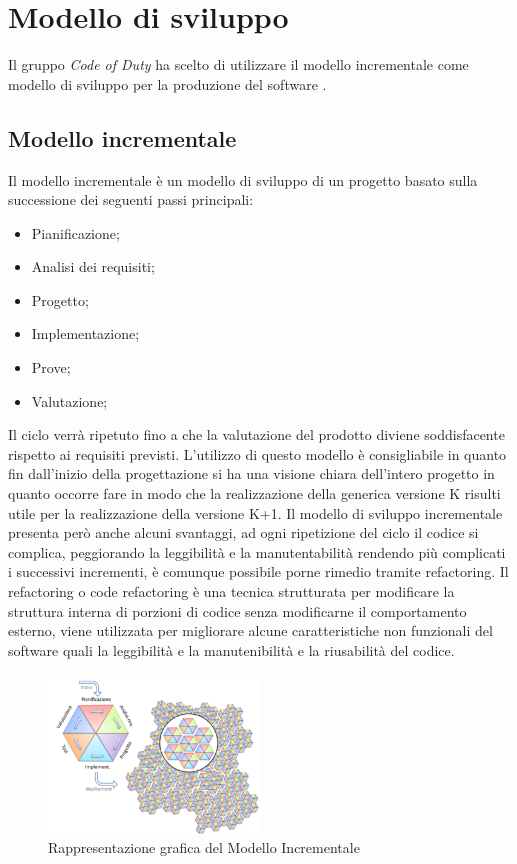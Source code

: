 \section{Modello di sviluppo}
Il gruppo \emph{Code of Duty} ha scelto di utilizzare il modello incrementale come modello di sviluppo per la produzione del software \hd .
\subsection{Modello incrementale}
Il modello incrementale è un modello di sviluppo di un progetto basato sulla successione dei seguenti passi principali:
\begin{itemize}
	\item Pianificazione;
	\item Analisi dei requisiti;
	\item Progetto;
	\item Implementazione;
	\item Prove;
	\item Valutazione;
\end{itemize}
Il ciclo verrà ripetuto fino a che la valutazione del prodotto diviene soddisfacente rispetto ai requisiti previsti.
L'utilizzo di questo modello è consigliabile in quanto fin dall'inizio della progettazione si ha una visione chiara 
dell'intero progetto in quanto occorre fare in modo che la realizzazione della generica versione K risulti utile per 
la realizzazione della versione K+1.
Il modello di sviluppo incrementale presenta però anche alcuni svantaggi, ad ogni ripetizione del ciclo il codice si complica, 
peggiorando la leggibilità e la manutentabilità rendendo più complicati i successivi incrementi, è comunque possibile porne rimedio tramite refactoring.
Il refactoring o code refactoring è una tecnica strutturata per modificare la struttura interna di porzioni di codice senza modificarne
il comportamento esterno, viene utilizzata per migliorare alcune caratteristiche non funzionali del software quali la leggibilità e la manutenibilità e la riusabilità del codice.
\begin{figure}[H]
        \centering
        \includegraphics[width=0.5\textwidth]{source/img/modelloincrementale.png}
        \caption{Rappresentazione grafica del Modello Incrementale}
\end{figure}
